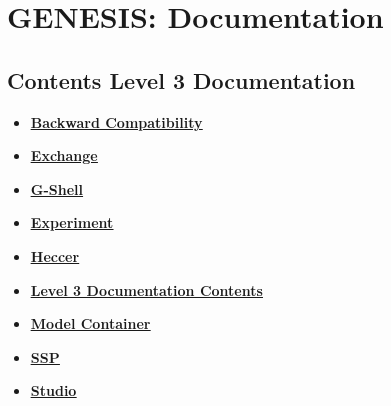\documentclass[12pt]{article}
\begin{document}
\section*{GENESIS: Documentation}

\subsection*{Contents Level 3 Documentation}

\begin{itemize}

\item \href{../tests-g2-backward-compatibility/tests-g2-backward-compatibility.pdf}{\bf \underline{Backward Compatibility}}

\item \href{../tests-exchange/tests-exchange.pdf}{\bf \underline{Exchange}}

\item \href{../tests-gshell/tests-gshell.pdf}{\bf \underline{G-Shell}}

\item \href{../tests-experiment/tests-experiment.pdf}{\bf \underline{Experiment}}

\item \href{../tests-heccer/tests-heccer.pdf}{\bf \underline{Heccer}}

\item \href{../contents-level3/contents-level3.pdf}{\bf \underline{Level 3 Documentation Contents}}

\item \href{../tests-model-container/tests-model-container.pdf}{\bf \underline{Model Container}}

\item \href{../tests-ssp/tests-ssp.pdf}{\bf \underline{SSP}}

\item \href{../tests-studio/tests-studio.pdf}{\bf \underline{Studio}}


\end{itemize}

\end{document}
